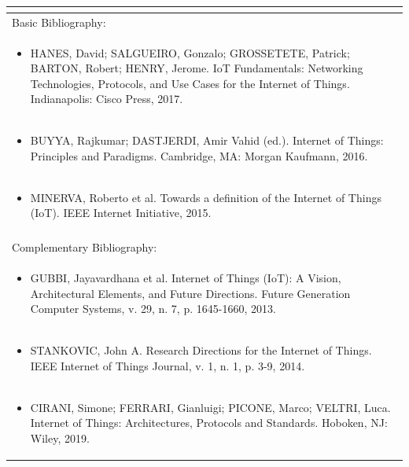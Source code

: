 \documentclass[11pt]{article}
\begin{document}
\begin{center}
\begin{longtable}{|p{4cm}|p{4cm}|p{4cm}|p{4cm}|}
\multicolumn{4}{|p{\dimexpr 16cm + 6\tabcolsep\relax}|}{}\\
\hline
\multicolumn{4}{|p{16cm}|}{Basic Bibliography:}\\*
\multicolumn{4}{|p{\dimexpr 16cm + 6\tabcolsep\relax}|}{\begin{itemize}\item HANES, David; SALGUEIRO, Gonzalo; GROSSETETE, Patrick; BARTON, Robert; HENRY, Jerome. IoT Fundamentals: Networking Technologies, Protocols, and Use Cases for the Internet of Things. Indianapolis: Cisco Press, 2017.\end{itemize}}\\
\multicolumn{4}{|p{\dimexpr 16cm + 6\tabcolsep\relax}|}{\begin{itemize}\item BUYYA, Rajkumar; DASTJERDI, Amir Vahid (ed.). Internet of Things: Principles and Paradigms. Cambridge, MA: Morgan Kaufmann, 2016.\end{itemize}}\\
\multicolumn{4}{|p{\dimexpr 16cm + 6\tabcolsep\relax}|}{\begin{itemize}\item MINERVA, Roberto et al. Towards a definition of the Internet of Things (IoT). IEEE Internet Initiative, 2015.\end{itemize}}\\
\multicolumn{4}{|p{16cm}|}{}\\
\hline
\multicolumn{4}{|p{16cm}|}{Complementary Bibliography:}\\*
\multicolumn{4}{|p{\dimexpr 16cm + 6\tabcolsep\relax}|}{\begin{itemize}\item GUBBI, Jayavardhana et al. Internet of Things (IoT): A Vision, Architectural Elements, and Future Directions. Future Generation Computer Systems, v. 29, n. 7, p. 1645-1660, 2013.\end{itemize}}\\
\multicolumn{4}{|p{\dimexpr 16cm + 6\tabcolsep\relax}|}{\begin{itemize}\item STANKOVIC, John A. Research Directions for the Internet of Things. IEEE Internet of Things Journal, v. 1, n. 1, p. 3-9, 2014.\end{itemize}}\\
\multicolumn{4}{|p{\dimexpr 16cm + 6\tabcolsep\relax}|}{\begin{itemize}\item CIRANI, Simone; FERRARI, Gianluigi; PICONE, Marco; VELTRI, Luca. Internet of Things: Architectures, Protocols and Standards. Hoboken, NJ: Wiley, 2019.\end{itemize}}\\

\end{longtable}
\end{center}
\end{document}
